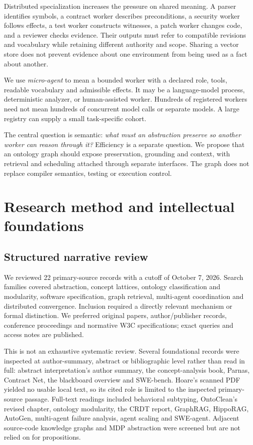 \documentclass[11pt]{article}
\begin{document}
Distributed specialization increases the pressure on shared meaning. A parser identifies symbols, a contract worker describes preconditions, a security worker follows effects, a test worker constructs witnesses, a patch worker changes code, and a reviewer checks evidence. Their outputs must refer to compatible revisions and vocabulary while retaining different authority and scope. Sharing a vector store does not prevent evidence about one environment from being used as a fact about another.

We use \emph{micro-agent} to mean a bounded worker with a declared role, tools, readable vocabulary and admissible effects. It may be a language-model process, deterministic analyzer, or human-assisted worker. Hundreds of registered workers need not mean hundreds of concurrent model calls or separate models. A large registry can supply a small task-specific cohort.

The central question is semantic: \emph{what must an abstraction preserve so another worker can reason through it?} Efficiency is a separate question. We propose that an ontology graph should expose preservation, grounding and context, with retrieval and scheduling attached through separate interfaces. The graph does not replace compiler semantics, testing or execution control.

\section{Research method and intellectual foundations}
\subsection{Structured narrative review}
We reviewed 22 primary-source records with a cutoff of October 7, 2026. Search families covered abstraction, concept lattices, ontology classification and modularity, software specification, graph retrieval, multi-agent coordination and distributed convergence. Inclusion required a directly relevant mechanism or formal distinction. We preferred original papers, author/publisher records, conference proceedings and normative W3C specifications; exact queries and access notes are published.

This is not an exhaustive systematic review. Several foundational records were inspected at author-summary, abstract or bibliographic level rather than read in full: abstract interpretation's author summary, the concept-analysis book, Parnas, Contract Net, the blackboard overview and SWE-bench. Hoare's scanned PDF yielded no usable local text, so its cited role is limited to the inspected primary-source passage. Full-text readings included behavioral subtyping, OntoClean's revised chapter, ontology modularity, the CRDT report, GraphRAG, HippoRAG, AutoGen, multi-agent failure analysis, agent scaling and SWE-agent. Adjacent source-code knowledge graphs and MDP abstraction were screened but are not relied on for propositions.
\end{document}
